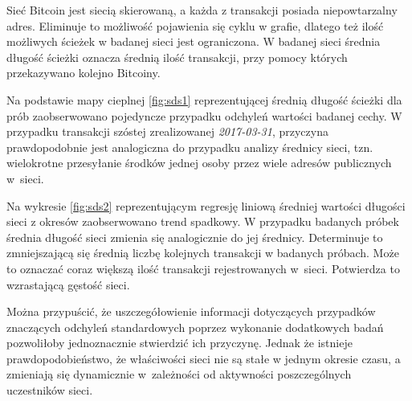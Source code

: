 \documentclass[12pt, twoside, final, openany]{mgr}
\begin{document}
\indent Sieć Bitcoin jest siecią skierowaną, a każda z transakcji posiada niepowtarzalny adres. Eliminuje to możliwość pojawienia się cyklu w grafie, dlatego też ilość możliwych ścieżek w badanej sieci jest ograniczona. W badanej sieci średnia długość ścieżki oznacza średnią ilość transakcji, przy pomocy których przekazywano kolejno Bitcoiny.

\indent Na podstawie mapy cieplnej \ref{fig:sds1} reprezentującej średnią długość ścieżki dla prób zaobserwowano pojedyncze przypadku odchyleń wartości badanej cechy. W przypadku transakcji szóstej zrealizowanej \textit{2017-03-31}, przyczyna prawdopodobnie jest analogiczna do przypadku analizy średnicy sieci, tzn. wielokrotne przesyłanie środków jednej osoby przez wiele adresów publicznych w~sieci.

\indent Na wykresie \ref{fig:sds2} reprezentującym regresję liniową średniej wartości długości sieci z okresów zaobserwowano trend spadkowy. W przypadku badanych próbek średnia długość sieci zmienia się analogicznie do jej średnicy. Determinuje to zmniejszającą się średnią liczbę kolejnych transakcji w badanych próbach. Może to oznaczać coraz większą ilość transakcji rejestrowanych w~sieci. Potwierdza to wzrastającą gęstość sieci.

\indent Można przypuścić, że uszczegółowienie informacji dotyczących przypadków znaczących odchyleń standardowych poprzez wykonanie dodatkowych badań pozwoliłoby jednoznacznie stwierdzić ich przyczynę. Jednak że istnieje prawdopodobieństwo, że właściwości sieci nie są stałe w jednym okresie czasu, a zmieniają się dynamicznie w~zależności od aktywności poszczególnych uczestników sieci.
\end{document}
